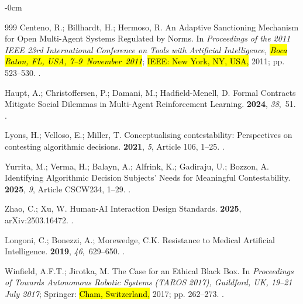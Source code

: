 \documentclass[mca,article,accept,pdftex,oneauthor]{Definitions/mdpi}
\begin{document}
\begin{adjustwidth}{-\extralength}{0cm}
\begin{thebibliography}{999}
Centeno, R.; Billhardt, H.; Hermoso, R.
\newblock An Adaptive Sanctioning Mechanism for Open Multi-Agent Systems
  Regulated by Norms.
\newblock In \emph{Proceedings of the 2011 IEEE 23rd International Conference on
  Tools with Artificial Intelligence, \hl{Boca Raton, FL, USA, \mbox{7--9 November 2011}}}; \hl{IEEE: New York, NY, USA,} 2011; pp. 523--530.
.

Haupt, A.; Christoffersen, P.; Damani, M.; Hadfield-Menell, D.
\newblock Formal Contracts Mitigate Social Dilemmas in Multi-Agent
  Reinforcement Learning.
 {\bf 2024}, {\em
  38},~51.
.

Lyons, H.; Velloso, E.; Miller, T.
\newblock Conceptualising contestability: Perspectives on contesting
  algorithmic decisions.
 {\bf
  2021}, {\em 5}, Article 106, 1--25.
.

Yurrita, M.; Verma, H.; Balayn, A.; Alfrink, K.; Gadiraju, U.; Bozzon, A.
\newblock Identifying Algorithmic Decision Subjects' Needs for Meaningful
  Contestability.
 {\bf 2025}, {\em 9}, Article CSCW234, 1--29.
.

Zhao, C.; Xu, W.
\newblock Human-AI Interaction Design Standards.
 {\bf 2025}, arXiv:2503.16472.
.

Longoni, C.; Bonezzi, A.; Morewedge, C.K.
\newblock Resistance to Medical Artificial Intelligence.
 {\bf 2019}, {\em 46},~629--650.
.

Winfield, A.F.T.; Jirotka, M.
\newblock The Case for an Ethical Black Box.
\newblock In \emph{Proceedings of Towards Autonomous Robotic Systems (TAROS 2017), Guildford, UK, 19--21 July 2017}; Springer: \hl{Cham, Switzerland,} 2017; pp. 262--273.
.


\end{thebibliography}
\end{adjustwidth}
\end{document}
